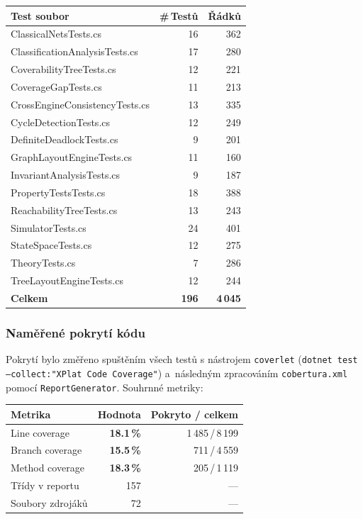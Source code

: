 \documentclass[12pt,a4paper]{article}
\begin{document}
\begin{longtable}{@{}p{6.0cm}rr@{}}
    \toprule
    \textbf{Test soubor} & \textbf{\#\,Testů} & \textbf{Řádků} \\
    \midrule
    \endhead
    ClassicalNetsTests.cs                & 16   & 362 \\
    ClassificationAnalysisTests.cs       & 17   & 280 \\
    CoverabilityTreeTests.cs             & 12   & 221 \\
    CoverageGapTests.cs                  & 11   & 213 \\
    CrossEngineConsistencyTests.cs       & 13   & 335 \\
    CycleDetectionTests.cs               & 12   & 249 \\
    DefiniteDeadlockTests.cs             & \phantom{0}9    & 201 \\
    GraphLayoutEngineTests.cs            & 11   & 160 \\
    InvariantAnalysisTests.cs            & \phantom{0}9    & 187 \\
    PropertyTestsTests.cs                & 18   & 388 \\
    ReachabilityTreeTests.cs             & 13   & 243 \\
    SimulatorTests.cs                    & 24   & 401 \\
    StateSpaceTests.cs                   & 12   & 275 \\
    TheoryTests.cs                       & \phantom{0}7    & 286 \\
    TreeLayoutEngineTests.cs             & 12   & 244 \\
    \midrule
    \textbf{Celkem}                      & \textbf{196} & \textbf{4\,045} \\
    \bottomrule
\end{longtable}

\subsubsection{Naměřené pokrytí kódu}

Pokrytí bylo změřeno spuštěním všech testů s nástrojem \texttt{coverlet}
(\texttt{dotnet test --collect:"XPlat Code Coverage"}) a~následným
zpracováním \texttt{cobertura.xml} pomocí \texttt{ReportGenerator}.
Souhrnné metriky:

\begin{longtable}{@{}p{6.0cm}rr@{}}
    \toprule
    \textbf{Metrika} & \textbf{Hodnota} & \textbf{Pokryto / celkem} \\
    \midrule
    \endhead
    Line coverage    & \textbf{18.1\,\%} & 1\,485\,/\,8\,199   \\
    Branch coverage  & \textbf{15.5\,\%} & \phantom{0}711\,/\,4\,559 \\
    Method coverage  & \textbf{18.3\,\%} & \phantom{0}205\,/\,1\,119 \\
    Třídy v reportu  & 157               & --- \\
    Soubory zdrojáků & \phantom{0}72     & --- \\
    \bottomrule
\end{longtable}
\end{document}
